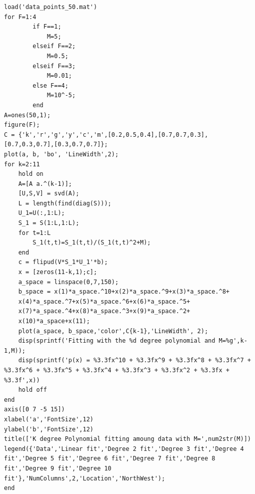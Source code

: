 \documentclass{report}
\begin{document}
\begin{tcolorbox}
\begin{lstlisting}
load('data_points_50.mat')
for F=1:4
        if F==1; 
            M=5;
        elseif F==2;
            M=0.5;
        elseif F==3;
            M=0.01;
        else F==4;
            M=10^-5;
        end
A=ones(50,1);
figure(F);
C = {'k','r','g','y','c','m',[0.2,0.5,0.4],[0.7,0.7,0.3],[0.7,0.3,0.7],[0.3,0.7,0.7]};
plot(a, b, 'bo', 'LineWidth',2);
for k=2:11
    hold on
    A=[A a.^(k-1)];
    [U,S,V] = svd(A);
    L = length(find(diag(S)));
    U_1=U(:,1:L);
    S_1 = S(1:L,1:L);
    for t=1:L
        S_1(t,t)=S_1(t,t)/(S_1(t,t)^2+M);
    end
    c = flipud(V*S_1*U_1'*b);
    x = [zeros(11-k,1);c];
    a_space = linspace(0,7,150);
    b_space = x(1)*a_space.^10+x(2)*a_space.^9+x(3)*a_space.^8+
    x(4)*a_space.^7+x(5)*a_space.^6+x(6)*a_space.^5+
    x(7)*a_space.^4+x(8)*a_space.^3+x(9)*a_space.^2+
    x(10)*a_space+x(11);
    plot(a_space, b_space,'color',C{k-1},'LineWidth', 2);
    disp(sprintf('Fitting with the %d degree polynomial and M=%g',k-1,M));
    disp(sprintf('p(x) = %3.3fx^10 + %3.3fx^9 + %3.3fx^8 + %3.3fx^7 + %3.3fx^6 + %3.3fx^5 + %3.3fx^4 + %3.3fx^3 + %3.3fx^2 + %3.3fx + %3.3f',x))
    hold off
end
axis([0 7 -5 15])
xlabel('a','FontSize',12)
ylabel('b','FontSize',12)
title(['K degree Polynomial fitting amoung data with M=',num2str(M)])
legend({'Data','Linear fit','Degree 2 fit','Degree 3 fit','Degree 4 fit','Degree 5 fit','Degree 6 fit','Degree 7 fit','Degree 8 fit','Degree 9 fit','Degree 10 fit'},'NumColumns',2,'Location','NorthWest');
end
\end{lstlisting}

\end{tcolorbox}
\end{document}
